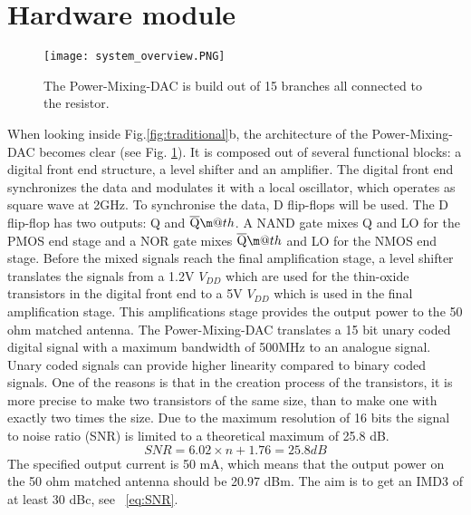 \makeatletter
\newcommand*{\textoverline}[1]{$\overline{\hbox{#1}}\m@th$}
\makeatother

\section{Hardware module}\label{sec:overview}
\begin{figure}[h]
\texttt{[image: system\_overview.PNG]}
\caption{The Power-Mixing-DAC is build out of 15 branches all connected to the resistor.}
\label{fig:system_overview}
\end{figure}
When looking inside Fig.\ref{fig:traditional}b, the architecture of the Power-Mixing-DAC becomes clear (see Fig. \ref{fig:system_overview}). It is composed out of several functional blocks: a digital front end structure, a level shifter and an amplifier. 
The digital front end synchronizes the data and modulates it with a local oscillator, which operates as square wave at 2GHz. To synchronise the data, D flip-flops will be used. The D flip-flop has two outputs: Q and \textoverline{Q}. A NAND gate mixes Q and LO for the PMOS end stage and a NOR gate mixes \textoverline{Q} and LO for the NMOS end stage. Before the mixed signals reach the final amplification stage, a level shifter translates the signals from a 1.2V $V_{DD}$ which are used for the thin-oxide transistors in the digital front end to a 5V $V_{DD}$ which is used in the final amplification stage. This amplifications stage provides the output power to the 50 ohm matched antenna.
The Power-Mixing-DAC translates a 15 bit unary coded digital signal with a maximum bandwidth of 500MHz to an analogue signal. Unary coded  signals can provide higher linearity compared to binary coded signals. One of the reasons is that in the creation process of the transistors, it is more precise to make two transistors of the same size, than to make one with exactly two times the size. Due to the maximum resolution of 16 bits the signal to noise ratio (SNR) is limited to a theoretical maximum of 25.8 dB.
\begin{equation}\label{eq:SNR}{SNR = 6.02 \times n + 1.76 = 25.8 dB}\end{equation}
The specified output current is 50 mA, which means that the output power on the 50 ohm matched antenna should be 20.97 dBm. The aim is to get an IMD3 of at least 30 dBc, see ~\ref{eq:SNR}.

